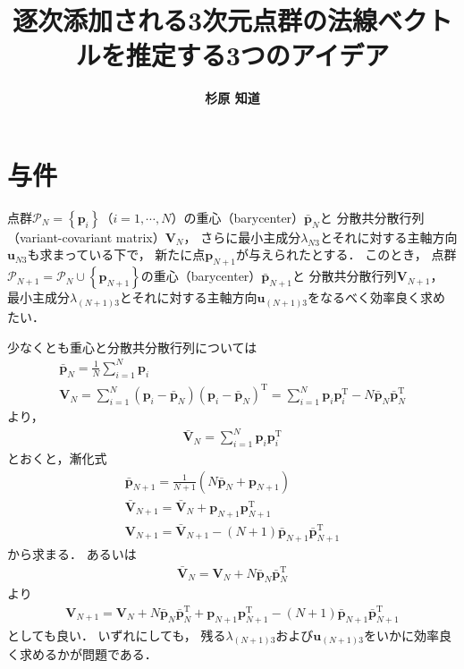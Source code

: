 ﻿\documentclass[a4paper]{jsarticle}
\title{\bf 逐次添加される3次元点群の法線ベクトルを推定する3つのアイデア}
\author{\Large{\bf 杉原 知道}}
\date{}
\begin{document}
\maketitle
\vspace{-\baselineskip}

\section{与件}

点群$\mathcal{P}_{N}=\left\{\bm{p}_{i}\right\}$（$i=1,\cdots,N$）の重心（barycenter）$\bar{\bm{p}}_{N}$と
分散共分散行列（variant-covariant matrix）$\bm{V}_{N}$，
さらに最小主成分$\lambda_{N3}$とそれに対する主軸方向$\bm{u}_{N3}$も求まっている下で，
新たに点$\bm{p}_{N+1}$が与えられたとする．
このとき，
点群$\mathcal{P}_{N+1}=\mathcal{P}_{N}\cup\left\{\bm{p}_{N+1}\right\}$の重心（barycenter）$\bar{\bm{p}}_{N+1}$と
分散共分散行列$\bm{V}_{N+1}$，
最小主成分$\lambda_{(N+1)3}$とそれに対する主軸方向$\bm{u}_{(N+1)3}$をなるべく効率良く求めたい．

少なくとも重心と分散共分散行列については
\begin{align*}
\bar{\boldsymbol{p}}_{N}=\frac{1}{N}\sum_{i=1}^{N}\boldsymbol{p}_{i}
\\
\boldsymbol{V}_{N}=\sum_{i=1}^{N}(\boldsymbol{p}_{i}-\bar{\boldsymbol{p}}_{N})(\boldsymbol{p}_{i}-\bar{\boldsymbol{p}}_{N})^{\mathrm{T}}
=\sum_{i=1}^{N}\boldsymbol{p}_{i}\boldsymbol{p}_{i}^{\mathrm{T}}-N\bar{\boldsymbol{p}}_{N}\bar{\boldsymbol{p}}_{N}^{\mathrm{T}}
\end{align*}
より，
\begin{align*}
\bar{\bm{V}}_{N}=\sum_{i=1}^{N}\boldsymbol{p}_{i}\boldsymbol{p}_{i}^{\mathrm{T}}
\end{align*}
とおくと，漸化式
\begin{align*}
\bar{\boldsymbol{p}}_{N+1}=\frac{1}{N+1}\left(N\bar{\boldsymbol{p}}_{N}+\boldsymbol{p}_{N+1}\right)
\\
\bar{\bm{V}}_{N+1}=\bar{\bm{V}}_{N}+\boldsymbol{p}_{N+1}\boldsymbol{p}_{N+1}^{\mathrm{T}}
\\
\bm{V}_{N+1}=\bar{\bm{V}}_{N+1}-(N+1)\bar{\bm{p}}_{N+1}\bar{\bm{p}}_{N+1}^{\mathrm{T}}
\end{align*}
から求まる．
あるいは
\begin{align*}
\bar{\bm{V}}_{N}=\bm{V}_{N}+N\bar{\bm{p}}_{N}\bar{\bm{p}}_{N}^{\mathrm{T}}
\end{align*}
より
\begin{align*}
\bm{V}_{N+1}=
\bm{V}_{N}+N\bar{\bm{p}}_{N}\bar{\bm{p}}_{N}^{\mathrm{T}}
+\boldsymbol{p}_{N+1}\boldsymbol{p}_{N+1}^{\mathrm{T}}
-(N+1)\bar{\bm{p}}_{N+1}\bar{\bm{p}}_{N+1}^{\mathrm{T}}
\end{align*}
としても良い．
いずれにしても，
残る$\lambda_{(N+1)3}$および$\bm{u}_{(N+1)3}$をいかに効率良く求めるかが問題である．
\end{document}
